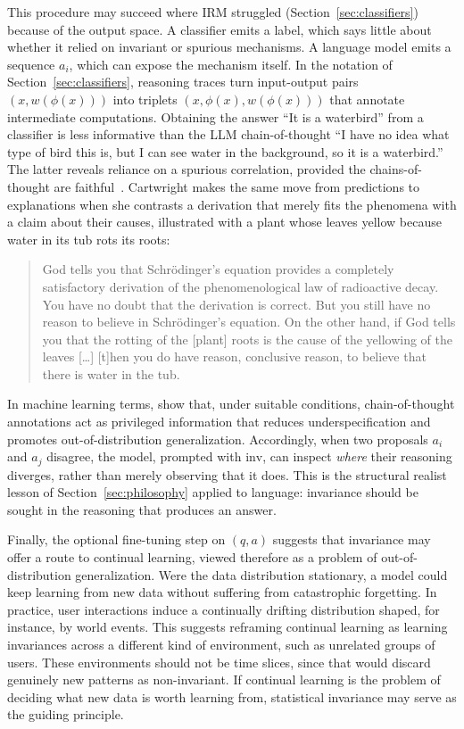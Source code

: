 This procedure may succeed where IRM struggled (Section~\ref{sec:classifiers}) because of the output space. A classifier emits a label, which says little about whether it relied on invariant or spurious mechanisms. A language model emits a sequence $a_i$, which can expose the mechanism itself. In the notation of Section~\ref{sec:classifiers}, reasoning traces turn input-output pairs $(x, w(\phi(x)))$ into triplets $(x, \phi(x), w(\phi(x)))$ that annotate intermediate computations. Obtaining the answer ``It is a waterbird'' from a classifier is less informative than the LLM chain-of-thought ``I have no idea what type of bird this is, but I can see water in the background, so it is a waterbird.'' The latter reveals reliance on a spurious correlation, provided the chains-of-thought are faithful~\citep{turpin2023language, lanham2023measuring}. Cartwright makes the same move from predictions to explanations when she contrasts a derivation that merely fits the phenomena with a claim about their causes, illustrated with a plant whose leaves yellow because water in its tub rots its roots:
\begin{quote}
God tells you that Schr\"{o}dinger's equation provides a completely satisfactory derivation of the phenomenological law of radioactive decay. You have no doubt that the derivation is correct. But you still have no reason to believe in Schr\"{o}dinger's equation. On the other hand, if God tells you that the rotting of the [plant] roots is the cause of the yellowing of the leaves [\ldots] [t]hen you do have reason, conclusive reason, to believe that there is water in the tub. \citep[p.~93]{cartwright1983}
\end{quote}
In machine learning terms, \citet{kartikcot} show that, under suitable conditions, chain-of-thought annotations act as privileged information that reduces underspecification and promotes out-of-distribution generalization. Accordingly, when two proposals $a_i$ and $a_j$ disagree, the model, prompted with $\mathrm{inv}$, can inspect \emph{where} their reasoning diverges, rather than merely observing that it does. This is the structural realist lesson of Section~\ref{sec:philosophy} applied to language: invariance should be sought in the reasoning that produces an answer.

Finally, the optional fine-tuning step on $(q, a)$ suggests that invariance may offer a route to continual learning, viewed therefore as a problem of out-of-distribution generalization. Were the data distribution stationary, a model could keep learning from new data without suffering from catastrophic forgetting. In practice, user interactions induce a continually drifting distribution shaped, for instance, by world events. This suggests reframing continual learning as learning invariances across a different kind of environment, such as unrelated groups of users. These environments should not be time slices, since that would discard genuinely new patterns as non-invariant. If continual learning is the problem of deciding what new data is worth learning from, statistical invariance may serve as the guiding principle.

